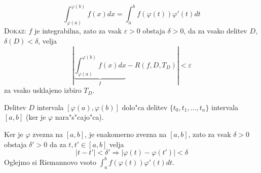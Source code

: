 \begin{equation*}
\int_{\varphi(a)}^{\varphi(b)} f(x) dx = \int_{a}^{b} f(\varphi(t)) \varphi'(t) dt
\end{equation*}
\textsc{Dokaz:} $f$ je integrabilna, zato za vsak $\varepsilon > 0$ obstaja $\delta > 0$, da za vsako delitev $D$, $\delta(D) < \delta$, velja
\begin{equation*}
\left| \underbrace{\int_{\varphi(a)}^{\varphi(b)} f(x) dx}_I - R(f, D, T_D) \right| < \varepsilon
\end{equation*}
za vsako usklajeno izbiro $T_D$.

Delitev $D$ intervala $[\varphi(a), \varphi(b)]$ dolo"ca delitev $\{t_0, t_1, \ldots, t_n\}$ intervala $[a, b]$ (ker je $\varphi$ nara"s"cajo"ca).

Ker je $\varphi$ zvezna na $[a, b]$, je enakomerno zvezna na $[a, b]$, zato za vsak $\delta > 0$ obstaja $\delta' > 0$ da za $t, t' \in [a, b]$ velja
\begin{equation*}
|t - t'| < \delta' \Rightarrow |\varphi(t) - \varphi(t')| < \delta
\end{equation*}
Oglejmo si Riemannovo vsoto $\int_a^b f(\varphi(t)) \varphi'(t) dt$.

